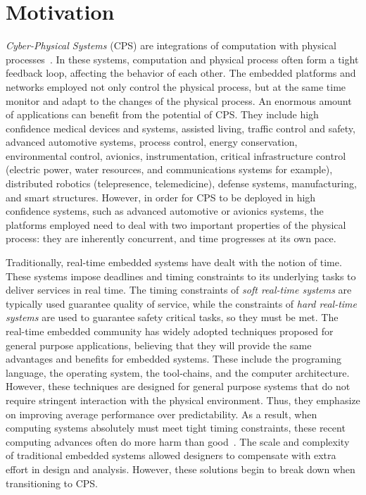 \section{Motivation}
\emph{Cyber-Physical Systems} (CPS) are integrations of computation with physical processes~\cite{Lee08_CyberPhysicalSystemsDesignChallenges}.
In these systems, computation and physical process often form a tight feedback loop, affecting the behavior of each other.
The embedded platforms and networks employed not only control the physical process, but at the same time monitor and adapt to the changes of the physical process.
An enormous amount of applications can benefit from the potential of CPS.
They include high confidence medical devices and systems, assisted living, traffic control and safety, advanced automotive systems, process control, energy conservation, environmental control, avionics, instrumentation, critical infrastructure control (electric power, water resources, and communications systems for example), distributed robotics (telepresence, telemedicine), defense systems, manufacturing, and smart structures.
However, in order for CPS to be deployed in high confidence systems, such as advanced automotive or avionics systems, the platforms employed need to deal with two important properties of the physical process: they are inherently concurrent, and time progresses at its own pace.
 

Traditionally, real-time embedded systems have dealt with the notion of time.
These systems impose deadlines and timing constraints to its underlying tasks to deliver services in real time. 
The timing constraints of \emph{soft real-time systems} are typically used guarantee quality of service, while the constraints of \emph{hard real-time systems} are used to guarantee safety critical tasks, so they must be met. 
The real-time embedded community has widely adopted techniques proposed for general purpose applications, believing that they will provide the same advantages and benefits for embedded systems.
These include the programing language, the operating system, the tool-chains, and the computer architecture.
However, these techniques are designed for general purpose systems that do not require stringent interaction with the physical environment. 
Thus, they emphasize on improving average performance over predictability.   
As a result, when computing systems absolutely must meet tight timing constraints, these recent computing advances often do more harm than good~\cite{LeeOnTime2005}.
The scale and complexity of traditional embedded systems allowed designers to compensate with extra effort in design and analysis. 
However, these solutions begin to break down when transitioning to CPS.   

